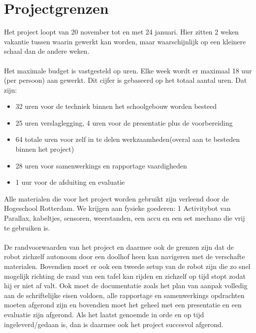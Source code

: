 \documentclass[oneside]{book}
\begin{document}
\clearpage
\chapter{Projectgrenzen}
Het project loopt van 20 november tot en met 24 januari. Hier zitten 2 weken vakantie tussen
waarin gewerkt kan worden, maar waarschijnlijk op een kleinere schaal dan de andere weken.\\
\\
Het maximale budget is vastgesteld op uren. Elke week wordt er maximaal 18 uur (per persoon) aan
gewerkt.
Dit cijfer is gebaseerd op het totaal aantal uren.
Dat zijn: 
\begin{itemize}
\item 32 uren voor de techniek binnen het schoolgebouw worden besteed
\item 25 uren verslaglegging, 4 uren voor de presentatie plus de voorbereiding
\item 64 totale uren voor zelf in te delen werkzaamheden(overal aan te besteden binnen het project)
\item 28 uren voor samenwerkings en rapportage vaardigheden  
\item 1 uur voor de afsluiting en evaluatie
\end{itemize}
Alle materialen die voor het project worden gebruikt zijn verleend door de Hogeschool
Rotterdam.
We krijgen aan fysieke goederen: 1 Activitybot van Parallax, kabeltjes, sensoren, weerstanden, een
accu en een set mechano die vrij te gebruiken is.\\
\\
De randvoorwaarden van het project en daarmee ook de grenzen zijn dat de robot zichzelf
autonoom door een doolhof heen kan navigeren met
de verschafte materialen. 
Bovendien moet er ook een tweede setup van de robot zijn die zo snel
mogelijk richting de rand van een tafel kan rijden en zichzelf op tijd stopt zodat hij er niet af valt.
Ook moet de documentatie zoals het plan van aanpak volledig aan de schriftelijke eisen voldoen, alle rapportage
en samenwerkings opdrachten moeten
afgerond zijn en bovendien moet het geheel met een presentatie en een evaluatie zijn afgerond.
Als het laatst genoemde in orde en op tijd ingeleverd/gedaan is, dan is daarmee ook het project
succesvol afgerond.
\clearpage
\end{document}
